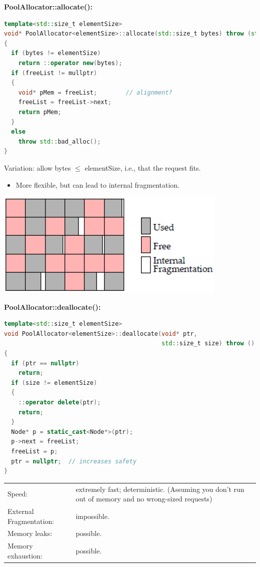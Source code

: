 \textbf{PoolAllocator::allocate():}
\begin{lstlisting}[language=C++]
template<std::size_t elementSize>
void* PoolAllocator<elementSize>::allocate(std::size_t bytes) throw (std::bad_alloc)
{
  if (bytes != elementSize)
    return ::operator new(bytes);
  if (freeList != mullptr)
  {
    void* pMem = freeList;        // alignment?
    freeList = freeList->next;
    return pMem;
  }
  else
    throw std::bad_alloc();
}
\end{lstlisting}
\begin{minipage}{0.6\linewidth}
Variation: allow bytes $\leq$ elementSize, i.e., that the request fits.
\begin{itemize}
  \item More flexible, but can lead to internal fragmentation.
\end{itemize}
\end{minipage}
\begin{minipage}{0.4\linewidth}
  \includegraphics[width=\linewidth]{images/AdvancedCPP/internalFragmentation.png}
\end{minipage}

\pagebreak %

\textbf{PoolAllocator::deallocate():}
\begin{lstlisting}[language=C++]
template<std::size_t elementSize>
void PoolAllocator<elementSize>::deallocate(void* ptr,
                                            std::size_t size) throw ()
{
  if (ptr == nullptr)
    return;
  if (size != elementSize)
  {
    ::operator delete(ptr);
    return;
  }
  Node* p = static_cast<Node*>(ptr);
  p->next = freeList;
  freeList = p;
  ptr = nullptr;  // increases safety
}
\end{lstlisting}

\begin{tabular}{|l|p{7cm}|}
  \hline
  Speed: & extremely fast; deterministic. (Assuming you don't run out of memory and no wrong-sized requests)\\
  External Fragmentation: & impossible.\\
  Memory leaks: & possible.\\
  Memory exhaustion: & possible.\\
  \hline
\end{tabular}

